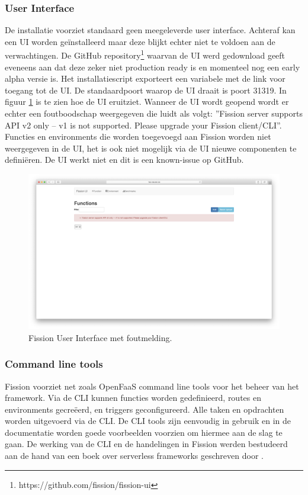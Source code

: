\subsubsection{User Interface}
De installatie voorziet standaard geen meegeleverde user interface. Achteraf kan een UI worden geïnstalleerd maar deze blijkt echter niet te voldoen aan de verwachtingen. De GitHub repository\footnote{https://github.com/fission/fission-ui} waarvan de UI werd gedownload geeft eveneens aan dat deze zeker niet production ready is en momenteel nog een early alpha versie is. Het installatiescript exporteert een variabele met de link voor toegang tot de UI. De standaardpoort waarop de UI draait is poort 31319. In figuur \ref{fig:fission-ui} is te zien hoe de UI eruitziet. Wanneer de UI wordt geopend wordt er echter een foutboodschap weergegeven die luidt als volgt: ''Fission server supports API v2 only -- v1 is not supported. Please upgrade your Fission client/CLI''. Functies en environments die worden toegevoegd aan Fission worden niet weergegeven in de UI, het is ook niet mogelijk via de UI nieuwe componenten te definiëren. De UI werkt niet en dit is een known-issue op GitHub.
\begin{figure}
    \includegraphics[width=1\textwidth]{img/fission-ui.png}
    \caption{Fission User Interface met foutmelding.}
    \label{fig:fission-ui}  
\end{figure}

\subsubsection{Command line tools}
Fission voorziet net zoals OpenFaaS command line tools voor het beheer van het framework. Via de CLI kunnen functies worden gedefinieerd, routes en environments gecreëerd, en triggers geconfigureerd. Alle taken en opdrachten worden uitgevoerd via de CLI. De CLI tools zijn eenvoudig in gebruik en in de documentatie worden goede voorbeelden voorzien om hiermee aan de slag te gaan. De werking van de CLI en de handelingen in Fission werden bestudeerd aan de hand van een boek over serverless frameworks geschreven door \textcite{McKendrick2018}.

